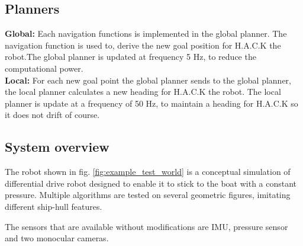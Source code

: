 

\subsection{Planners}
\noindent
\textbf{Global: }Each navigation functions is implemented in the global planner. The navigation function is used to, derive the new goal position for H.A.C.K the robot.The global planner is updated at frequency 5 Hz, to reduce the computational power.\\
\textbf{Local: } For each new goal point the global planner sends to the global planner, the local planner calculates a new heading for H.A.C.K the robot. The local planner is update at a frequency of 50 Hz, to maintain a heading for H.A.C.K so it does not drift of course.


\subsection{System overview}
The robot shown in fig. \ref{fig:example_test_world} is a conceptual simulation of differential drive robot designed to enable it to stick to the boat with a constant pressure. Multiple algorithms are tested on several geometric figures, imitating different ship-hull features. 


The sensors that are available without modifications are IMU, pressure sensor and two monocular cameras.








